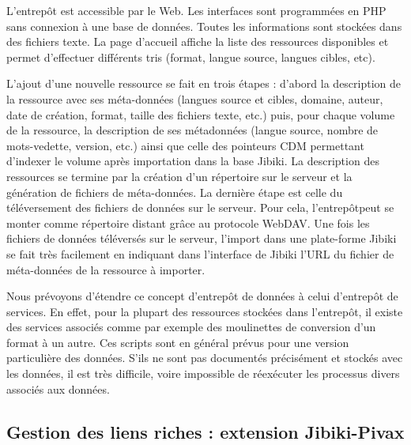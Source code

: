 \documentclass[10pt,a4paper,twoside]{article}
\begin{document}
\begin{itemize}
L'entrepôt est accessible par le Web. Les interfaces sont programmées en PHP sans connexion à une base de données. Toutes les informations sont stockées dans des fichiers texte. 
La page d'accueil affiche la liste des ressources disponibles et permet d'effectuer différents tris (format, langue source, langues cibles, etc).

L'ajout d'une nouvelle ressource se fait en trois étapes : d'abord la description de la ressource avec ses méta-données (langues source et cibles, domaine, auteur, date de création, format, taille des fichiers texte, etc.) puis, pour chaque volume de la ressource, la description de ses métadonnées (langue source, nombre de mots-vedette, version, etc.) ainsi que celle des pointeurs CDM permettant d'indexer le volume après importation dans la base Jibiki.
La description des ressources se termine par la création d'un répertoire sur le serveur et la génération de fichiers de méta-données.
La dernière étape est celle du téléversement des fichiers de données sur le serveur. Pour cela, l'entrepôtpeut se monter comme répertoire distant grâce au protocole WebDAV.
Une fois les fichiers de données téléversés sur le serveur, l'import dans une plate-forme Jibiki se fait très facilement en indiquant dans l'interface de Jibiki l'URL du fichier de méta-données de la ressource à importer.

Nous prévoyons d'étendre ce concept d'entrepôt de données à celui d'entrepôt de services. En effet, pour la plupart des ressources stockées dans l'entrepôt, il existe des services associés comme par exemple des moulinettes de conversion d'un format à un autre. Ces scripts sont en général prévus pour une version particulière des données. S'ils ne sont pas documentés précisément et stockés avec les données, il est très difficile, voire impossible de réexécuter les processus divers associés aux données.


\subsection{Gestion des liens riches : extension Jibiki-Pivax}


\end{itemize}
\end{document}
